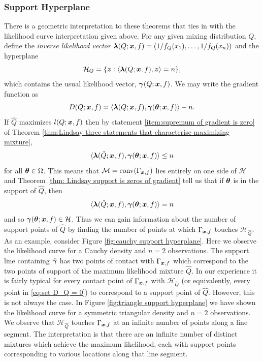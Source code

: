 	\subsubsection{Support Hyperplane}
	\label{sec: support hyperplane}
	There is a geometric interpretation to these theorems that ties in with the likelihood curve interpretation given above. For any given mixing distribution $Q$, define the \emph{inverse likelihood vector} ${\bm{{\lambda}}}(Q;{\bm{{x}}},f) = (1/f_Q(x_1),\dots, 1/f_Q(x_n))$ and the hyperplane
	\begin{equation}
		\mathcal{H}_{Q} = \{{\bm{{z}}} : \langle {\bm{{\lambda}}}(Q;{\bm{{x}}},f), {\bm{{z}}}\rangle = n\},
	\end{equation}
	which contains the usual likelihood vector, ${\bm{{\gamma}}}(Q;{\bm{{x}}}, f)$. We may write the gradient function as
	\begin{equation}
		D(Q;{\bm{{x}}},f) = \langle {\bm{{\lambda}}}(Q;{\bm{{x}}},f), {\bm{{\gamma}}}({\bm{{\theta}}};{\bm{{x}}},f)\rangle - n.
	\end{equation}
	If $\hat{Q}$ maximizes $l(Q;{\bm{{x}}},f)$ then by statement \ref{item:supremum of gradient is zero} of Theorem \ref{thm:Lindsay three statements that characterise maximizing mixture}, 
	\begin{equation}
		\langle {\bm{{\lambda}}}(\hat{Q};{\bm{{x}}},f), {\bm{{\gamma}}}({\bm{{\theta}}};{\bm{{x}}},f) \rangle \leq n
	\end{equation}
	for all ${\bm{{\theta}}} \in \Omega$. This means that $\mathcal{M} = \mathrm{conv}(\Gamma_{{\bm{{x}}},f})$ lies entirely on one side of $\mathcal{H}$ and Theorem \ref{thm: Lindsay support is zeros of gradient} tell us that if ${\bm{{\theta}}}$ is in the support of $\hat{Q}$, then 
	\begin{equation}
		\langle {\bm{{\lambda}}}(\hat{Q};{\bm{{x}}},f), {\bm{{\gamma}}}({\bm{{\theta}}};{\bm{{x}}},f) \rangle = n
	\end{equation}
	and so ${\bm{{\gamma}}}({\bm{{\theta}}};{\bm{{x}}},f) \in \mathcal{H}$. Thus we can gain information about the number of support points of $\hat{Q}$ by finding the number of points at which $\Gamma_{{\bm{{x}}},f}$ touches $\mathcal{H}_{\hat{Q}}$. As an example, consider Figure \ref{fig:cauchy support hyperplane}. Here we observe the likelihood curve for a Cauchy density and $n = 2$ observations. The support line containing $\hat{{\bm{{\gamma}}}}$ has two points of contact with $\Gamma_{{\bm{{x}}}, f}$ which correspond to the two points of support of the maximum likelihood mixture $\hat{Q}$. In our experience it is fairly typical for every contact point of $\Gamma_{{\bm{{x}}}, f}$ with $\mathcal{H}_{\hat{Q}}$ (or equivalently, every point in \eqref{eq:set D_Q = 0}) to correspond to a support point of $\hat{Q}$. However, this is not always the case. In Figure \ref{fig:triangle support hyperplane} we have shown the likelihood curve for a symmetric triangular density and $n =2$ observations. We observe that $\mathcal{H}_{\hat{Q}}$ touches $\Gamma_{{\bm{{x}}}, f}$ at an infinite number of points along a line segment. The interpretation is that there are an infinite number of distinct mixtures which achieve the maximum likelihood, each with support points corresponding to various locations along that line segment.

